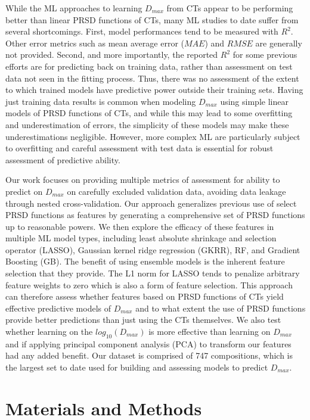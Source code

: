 \documentclass[11pt,a4paper]{article}
\begin{document}
\par
While the ML approaches to learning $D_{max}$ from CTs appear to be performing better than linear PRSD functions of CTs, many ML studies to date suffer from several shortcomings. First, model performances tend to be measured with $R^{2}$. Other error metrics such as mean average error ($MAE$) and $RMSE$ are generally not provided. Second, and more importantly, the reported $R^{2}$ for some previous efforts are for predicting back on training data, rather than assessment on test data not seen in the fitting process. Thus, there was no assessment of the extent to which trained models have predictive power outside their training sets. Having just training data results is common when modeling $D_{max}$ using simple linear models of PRSD functions of CTs, and while this may lead to some overfitting and underestimation of errors, the simplicity of these models may make these underestimations negligible. However, more complex ML are particularly subject to overfitting and careful assessment with test data is essential for robust assessment of predictive ability.

\par
Our work focuses on providing multiple metrics of assessment for ability to predict on $D_{max}$ on carefully excluded validation data, avoiding data leakage through nested cross-validation. Our approach generalizes previous use of select PRSD functions as features by generating a comprehensive set of PRSD functions up to reasonable powers. We then explore the efficacy of these features in multiple ML model types, including least absolute shrinkage and selection operator (LASSO), Gaussian kernel ridge regression (GKRR), RF, and Gradient Boosting (GB). The benefit of using ensemble models is the inherent feature selection that they provide. The L1 norm for LASSO tends to penalize arbitrary feature weights to zero which is also a form of feature selection. This approach can therefore assess whether features based on PRSD functions of CTs yield effective predictive models of $D_{max}$ and to what extent the use of PRSD functions provide better predictions than just using the CTs themselves. We also test whether learning on the $log_{10}(D_{max})$ is more effective than learning on $D_{max}$ and if applying principal component analysis (PCA) to transform our features had any added benefit. Our dataset is comprised of 747 compositions, which is the largest set to date used for building and assessing models to predict $D_{max}$.

\section{Materials and Methods}\label{Methods}
\end{document}
